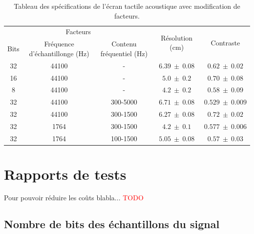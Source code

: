 \documentclass[11pt,letterpaper]{article}
\begin{document}
\begin{table}[H]
    \centering
    \begin{tabular}{c c c | c c}
    \hline
    \multicolumn{3}{c|}{Facteurs} & \multirow{2}{*}{Résolution (cm)} & \multirow{2}{*}{Contraste} \\ 
    Bits & Fréquence d'échantillonge (Hz) & Contenu fréquentiel (Hz) & & \\
    \hline
    32 & 44100 & - & $6.39\ \pm \ 0.08$ & $0.62 \ \pm\ 0.02$ \\
    16 & 44100 & - & $5.0\ \pm \ 0.2$ & $0.70 \ \pm\ 0.08$ \\
    8 & 44100 & - & $4.2 \ \pm\ 0.2$ & $0.58  \ \pm\ 0.09$ \\
    32 & 44100 & 300-5000 & $6.71\ \pm\ 0.08$ & $0.529\ \pm\ 0.009$ \\
    32 & 44100 & 300-1500 &	$6.27\ \pm\ 0.08$ &	$0.72\ \pm\ 0.02$ \\
    32 & 1764 & 300-1500 &	$4.2\ \pm\ 0.1$ & $0.577\ \pm\ 0.006$\\
    32 & 1764 & 100-1500 & $5.05\ \pm\ 0.08$ & $0.57\ \pm\ 0.03$ \\
    \hline
    \end{tabular}
    \caption{Tableau des spécifications de l'écran tactile acoustique avec modification de facteurs.\label{specs}}
  \end{table}


\section{Rapports de tests}






Pour pouvoir réduire les coûts blabla... \textcolor{red}{TODO}

\subsection{Nombre de bits des échantillons du signal}
\end{document}
